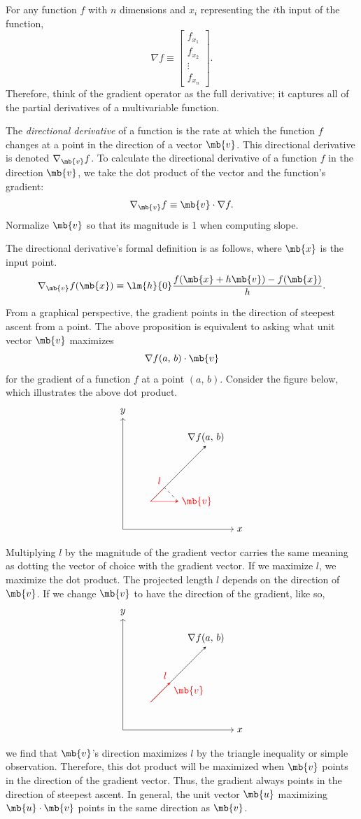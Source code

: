 \documentclass[11pt]{article}
\theoremstyle{definition}
\begin{document}
For any function $f$ with $n$ dimensions and $x_i$ representing the $i$th input of the function, 
$$
\nabla f \equiv \left[\begin{array}{c}f_{x_1} \\f_{x_2}\\\vdots\\f_{x_n}\end{array}\right].
$$
Therefore, think of the gradient operator as the full derivative; it captures all of the partial derivatives of a multivariable function.


The \textit{directional derivative} of a function is the rate at which the function $f$ changes at a point in the direction of a vector $\mb{v}$. This directional derivative is denoted $\nabla_\mb{v} f$. To calculate the directional derivative of a function $f$ in the direction $\mb{v}$, we take the dot product of the vector and the function's gradient:
$$
\nabla_\mb{v} f\equiv\mb{v}\cdot\nabla f.
$$
Normalize $\mb{v}$ so that its magnitude is 1 when computing slope.


The directional derivative's formal definition is as follows, where $\mb{x}$ is the input point.
$$
\nabla_\mb{v} f(\mb{x}) \equiv \lm{h}{0}\frac{f(\mb{x}+h\mb{v}) - f(\mb{x})}{h}.
$$


From a graphical perspective, the gradient points in the direction of steepest ascent from a point.
\bp
The above proposition is equivalent to asking what unit vector $\mb{v}$ maximizes
$$
\nabla f(a,\, b) \cdot \mb{v}
$$
for the gradient of a function $f$ at a point $(a,\, b)$. Consider the figure below, which illustrates the above dot product.
$$
\begin{tikzpicture}
\draw[->] (0,0)--(4,0) node[right]{$x$};
\draw[->] (0,0)--(0,4) node[above]{$y$};
\draw[-stealth](1,1)--(3,3) node[anchor=south]{$\nabla f(a,\, b) $};
\draw[-stealth, red](1,1)--(2,1) node[anchor=west]{$\mb{v} $};
\draw[dashed](2,1)--(1.5,1.5);
\draw[red](1,1)--(1.5,1.5) node[anchor=south east]{ $l $};
\end{tikzpicture}
$$
Multiplying $l$ by the magnitude of the gradient vector carries the same meaning as dotting the vector of choice with the gradient vector. If we maximize $l$, we maximize the dot product. The projected length $l$ depends on the direction of $\mb{v}$. If we change $\mb{v}$ to have the direction of the gradient, like so, 
$$
\begin{tikzpicture}
\draw[->] (0,0)--(4,0) node[right]{$x$};
\draw[->] (0,0)--(0,4) node[above]{$y$};
\draw[-stealth](1,1)--(3,3) node[anchor=south]{$\nabla f(a,\, b) $};
\draw[-stealth, red](1,1)--(1.70710678119,1.70710678119) node[anchor=north west]{$\mb{v} $};
\draw[red](1,1)--(1.70710678119,1.70710678119) node[anchor=south east]{ $l $};
\end{tikzpicture}
$$
we find that $\mb{v}$'s direction maximizes $l$ by the triangle inequality or simple observation. Therefore, this dot product will be maximized when $\mb{v}$ points in the direction of the gradient vector. Thus, the gradient always points in the direction of steepest ascent.
\ep
In general, the unit vector $\mb{u}$ maximizing $\mb{u}\cdot\mb{v}$ points in the same direction as $\mb{v}$.
\end{document}
